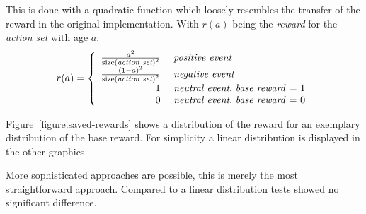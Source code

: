 This is done with a quadratic function which loosely resembles the transfer of the reward in the original implementation. With \(r(a)\) being the \emph{reward} for the \emph{action set} with age \(a\):
$$
r(a) = \left\{ \begin{array}{rl}
  \frac{{a}^{2}}{{\mathrm{size(\emph{action set})}}^{2}} &\mbox{ \emph{positive event}} \\
  \frac{{(1 - a)}^{2}}{{\mathrm{size(\emph{action set})}}^{2}} &\mbox{ \emph{negative event}} \\
  1 &\mbox{ \emph{neutral event}, \emph{base reward} = $1$} \\
  0 &\mbox{ \emph{neutral event}, \emph{base reward} = $0$}
       \end{array} \right.
$$

Figure~\ref{figure:saved-rewards} shows a distribution of the reward for an exemplary distribution of the base reward. For simplicity a linear distribution is displayed in the other graphics.

More sophisticated approaches are possible, this is merely the most straightforward approach. Compared to a linear distribution tests showed no significant difference. 

